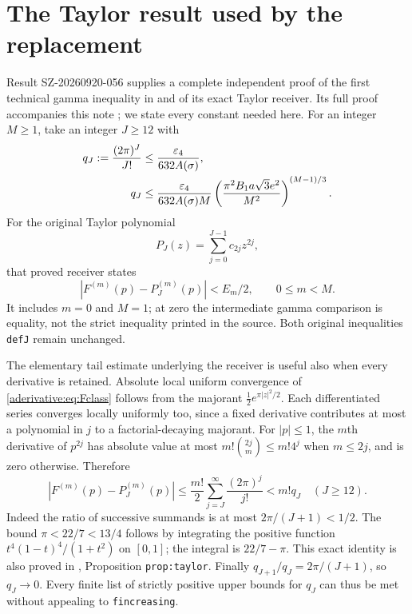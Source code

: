 \documentclass[11pt]{article}
\begin{document}
\section{The Taylor result used by the replacement}\label{aderivative:sec:taylor}
Result SZ-20260920-056 supplies a complete independent proof of
the first technical gamma inequality in \cite{aderivative:AriasII} and of
its exact Taylor receiver. Its full proof accompanies this note
\cite{aderivative:GammaProof}; we state every constant needed here.
For an integer $M\ge1$, take an integer $J\ge12$ with
\begin{align}
q_J:=\frac{(2\pi)^J}{J!}
&\le\frac{\varepsilon_4}{632A(\sigma)},\label{aderivative:eq:J1}\\
q_J&\le\frac{\varepsilon_4}{632A(\sigma)M}
\left(\frac{\pi^2B_1a\sqrt3e^2}{M^2}\right)^{(M-1)/3}.
\label{aderivative:eq:J2}
\end{align}
For the original Taylor polynomial
\begin{equation}\label{aderivative:eq:P}
P_J(z)=\sum_{j=0}^{J-1}c_{2j}z^{2j},
\end{equation}
that proved receiver states
\begin{equation}\label{aderivative:eq:Taylor}
|F^{(m)}(p)-P_J^{(m)}(p)|<E_m/2,
\qquad 0\le m<M.
\end{equation}
It includes $m=0$ and $M=1$; at zero the intermediate gamma
comparison is equality, not the strict inequality printed in
the source. Both original inequalities \texttt{defJ} remain unchanged.

The elementary tail estimate underlying the receiver is useful
also when every derivative is retained. Absolute local uniform
convergence of \eqref{aderivative:eq:Fclass} follows from the majorant
$\tfrac12 e^{\pi |z|^2/2}$. Each differentiated series converges
locally uniformly too, since a fixed derivative contributes at
most a polynomial in $j$ to a factorial-decaying majorant.
For $|p|\le1$, the $m$th derivative of $p^{2j}$ has absolute
value at most $m!\binom{2j}{m}\le m!4^j$ when $m\le2j$,
and is zero otherwise. Therefore
\begin{equation}\label{aderivative:eq:directtail}
|F^{(m)}(p)-P_J^{(m)}(p)|
\le\frac{m!}2\sum_{j=J}^\infty\frac{(2\pi)^j}{j!}
<m!q_J\quad(J\ge12).
\end{equation}
Indeed the ratio of successive summands is at most
$2\pi/(J+1)<1/2$. The bound $\pi<22/7<13/4$ follows by
integrating the positive function
$t^4(1-t)^4/(1+t^2)$ on $[0,1]$; the integral is
$22/7-\pi$. This exact identity is also proved in
\cite{aderivative:GammaProof}, Proposition \texttt{prop:taylor}.
Finally $q_{J+1}/q_J=2\pi/(J+1)$, so $q_J\to0$.
Every finite list of strictly positive upper bounds for $q_J$
can thus be met without appealing to \texttt{fincreasing}.
\end{document}
